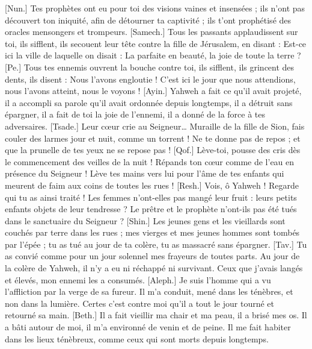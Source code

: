 \begin{multicols}{2}
[Nun.] Tes prophètes ont eu pour toi des visions vaines et insensées ; ils n'ont pas découvert ton iniquité, afin de détourner ta captivité ; ils t'ont prophétisé des oracles mensongers et trompeurs.
[Samech.] Tous les passants applaudissent sur toi, ils sifflent, ils secouent leur tête contre la fille de Jérusalem, en disant : Est-ce ici la ville de laquelle on disait : La parfaite en beauté, la joie de toute la terre ?
[Pe.] Tous tes ennemis ouvrent la bouche contre toi, ils sifflent, ils grincent des dents, ils disent : Nous l'avons engloutie ! C'est ici le jour que nous attendions, nous l'avons atteint, nous le voyons !
[Ayin.] Yahweh a fait ce qu'il avait projeté, il a accompli sa parole qu'il avait ordonnée depuis longtemps, il a détruit sans épargner, il a fait de toi la joie de l'ennemi, il a donné de la force à tes adversaires.
[Tsade.] Leur cœur crie au Seigneur… Muraille de la fille de Sion, fais couler des larmes jour et nuit, comme un torrent ! Ne te donne pas de repos ; et que la prunelle de tes yeux ne se repose pas !
[Qof.] Lève-toi, pousse des cris dès le commencement des veilles de la nuit ! Répands ton cœur comme de l'eau en présence du Seigneur ! Lève tes mains vers lui pour l'âme de tes enfants qui meurent de faim aux coins de toutes les rues !
[Resh.] Vois, ô Yahweh ! Regarde qui tu as ainsi traité ! Les femmes n'ont-elles pas mangé leur fruit : leurs petits enfants objets de leur tendresse ? Le prêtre et le prophète n'ont-ils pas été tués dans le sanctuaire du Seigneur ?
[Shin.] Les jeunes gens et les vieillards sont couchés par terre dans les rues ; mes vierges et mes jeunes hommes sont tombés par l'épée ; tu as tué au jour de ta colère, tu as massacré sans épargner.
[Tav.] Tu as convié comme pour un jour solennel mes frayeurs de toutes parts. Au jour de la colère de Yahweh, il n'y a eu ni réchappé ni survivant. Ceux que j'avais langés et élevés, mon ennemi les a consumés.
\VerseOne{}[Aleph.] Je suis l'homme qui a vu l'affliction par la verge de sa fureur.
Il m'a conduit, mené dans les ténèbres, et non dans la lumière.
Certes c'est contre moi qu'il a tout le jour tourné et retourné sa main.
[Beth.] Il a fait vieillir ma chair et ma peau, il a brisé mes os.
Il a bâti autour de moi, il m'a environné de venin et de peine.
Il me fait habiter dans les lieux ténèbreux, comme ceux qui sont morts depuis longtemps.

\end{multicols}
